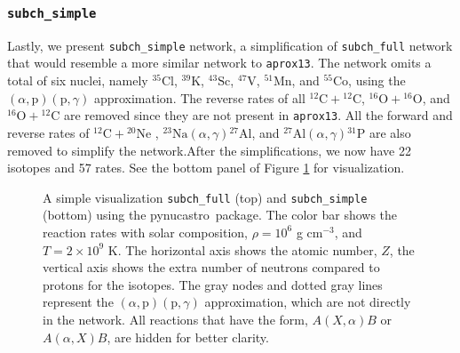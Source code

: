 \documentclass[preprint,times,tighten]{aastex631}
\newcommand{\pynucastro}{{\sf pynucastro}}
\begin{document}
\begin{comment}
This gives {\tt subch\_full\_mod} 27 isotopes and 103 rates in total. The second and third panel of Figure \ref{fig:networks} gives an overview of {\tt subch\_full} and {\tt subch\_full\_mod} networks. Here we note that \cite{Shen_2009} also discussed that the $\alpha$-capture chain, ${}^{14}\mbox{C}(\alpha,\gamma){}^{18}\mbox{O}(\alpha,\gamma){}^{22}\mbox{Ne}$, will take place at temperatures $\gtrsim 10^9$ K. However, this process is currently not considered since the energy contribution from this rate is likely to be negligible due to the small abundance of ${}^{14}\mbox{C}$ during nucleosynthesis. 
\end{comment}

\subsubsection{\tt subch\_simple}

Lastly, we present {\tt subch\_simple} network, a simplification of {\tt subch\_full} network that would resemble a more similar network to {\tt aprox13}. The network omits a total of six nuclei, namely ${}^{35}\mbox{Cl}$, ${}^{39}\mbox{K}$, ${}^{43}\mbox{Sc}$, ${}^{47}\mbox{V}$, ${}^{51}\mbox{Mn}$, and ${}^{55}\mbox{Co}$, using the $(\alpha, \mbox{p})(\mbox{p}, \gamma)$ approximation. The reverse rates of all ${}^{12}\mbox{C} + {}^{12}\mbox{C}$,  ${}^{16}\mbox{O} + {}^{16}\mbox{O}$, and ${}^{16}\mbox{O} + {}^{12}\mbox{C}$ are removed since they are not present in {\tt aprox13}. All the forward and reverse rates of ${}^{12}\mbox{C} + {}^{20}\mbox{Ne}$ , ${}^{23}\mbox{Na}(\alpha, \gamma){}^{27}\mbox{Al}$, and ${}^{27}\mbox{Al}(\alpha, \gamma){}^{31}\mbox{P}$ are also removed to simplify the network.After the simplifications, we now have 22 isotopes and 57 rates. See the bottom panel of Figure \ref{fig:networks} for visualization.

\begin{figure}
\centering
\caption{\label{fig:networks} A simple visualization {\tt subch\_full} (top) and {\tt subch\_simple} (bottom) using the \pynucastro\ package. The color bar shows the reaction rates with solar composition, $\rho = 10^6$ g $\mathrm{cm}^{-3}$, and $T = 2 \times 10^9$ K. The horizontal axis shows the atomic number, $Z$, the vertical axis shows the extra number of neutrons compared to protons for the isotopes. The gray nodes and dotted gray lines represent the $(\alpha, \mbox{p})(\mbox{p}, \gamma)$ approximation, which are not directly in the network. All reactions that have the form, $A(X, \alpha)B$ or $A(\alpha, X)B$, are hidden for better clarity. }
\end{figure}
\end{document}
